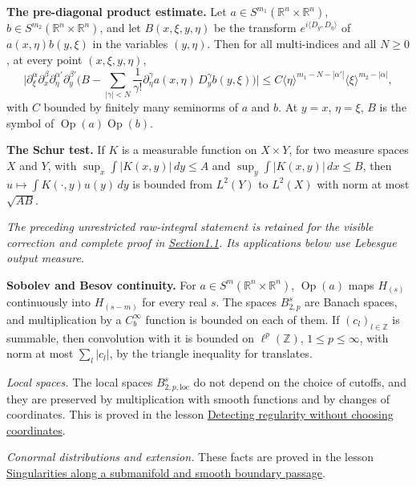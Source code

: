 \documentclass[
  11pt,
]{article}
\begin{document}
\textbf{The pre-diagonal product estimate.} Let
\(a\in S^{m_1}(\mathbb R^n\times\mathbb R^n)\),
\(b\in S^{m_2}(\mathbb R^n\times\mathbb R^n)\), and let
\(B(x,\xi,y,\eta)\) be the transform \(e^{i\langle D_y,D_\eta\rangle}\)
of \(a(x,\eta)b(y,\xi)\) in the variables \((y,\eta)\). Then for all
multi-indices and all \(N\geq0\), at every point \((x,\xi,y,\eta)\), \[
\Big|\partial_\xi^\alpha\partial_x^\beta\partial_\eta^{\alpha'}\partial_y^{\beta'}\Big(B-\sum_{|\gamma|<N}\frac1{\gamma!}\partial_\eta^\gamma a(x,\eta)\,D_y^\gamma b(y,\xi)\Big)\Big|\leq C\langle\eta\rangle^{m_1-N-|\alpha'|}\langle\xi\rangle^{m_2-|\alpha|},
\] with \(C\) bounded by finitely many seminorms of \(a\) and \(b\). At
\(y=x\), \(\eta=\xi\), \(B\) is the symbol of
\(\operatorname{Op}(a)\operatorname{Op}(b)\).

\textbf{The Schur test.} If \(K\) is a measurable function on
\(X\times Y\), for two measure spaces \(X\) and \(Y\), with
\(\sup_x\int|K(x,y)|\,dy\leq A\) and \(\sup_y\int|K(x,y)|\,dx\leq B\),
then \(u\mapsto\int K(\cdot,y)u(y)\,dy\) is bounded from \(L^2(Y)\) to
\(L^2(X)\) with norm at most \(\sqrt{AB}\).

\emph{The preceding unrestricted raw-integral statement is retained for
the visible correction and complete proof in
\hyperref[AN03-TC-SCHUR-001]{Section1.1}. Its applications below use
Lebesgue output measure.}

\textbf{Sobolev and Besov continuity.} For
\(a\in S^m(\mathbb R^n\times\mathbb R^n)\), \(\operatorname{Op}(a)\)
maps \(H_{(s)}\) continuously into \(H_{(s-m)}\) for every real \(s\).
The spaces \(B^s_{2,p}\) are Banach spaces, and multiplication by a
\(C^\infty_b\) function is bounded on each of them. If
\((c_l)_{l\in\mathbb Z}\) is summable, then convolution with it is
bounded on \(\ell^p(\mathbb Z)\), \(1\leq p\leq\infty\), with norm at
most \(\sum_l|c_l|\), by the triangle inequality for translates.

\emph{Local spaces.} The local spaces \(B^s_{2,p,\mathrm{loc}}\) do not
depend on the choice of cutoffs, and they are preserved by
multiplication with smooth functions and by changes of coordinates. This
is proved in the lesson
\href{geometric-microlocal-calculus.pdf}{Detecting regularity without
choosing coordinates}.

\emph{Conormal distributions and extension.} These facts are proved in
the lesson \href{conormal-transmission.pdf}{Singularities along a
submanifold and smooth boundary passage}.
\end{document}
